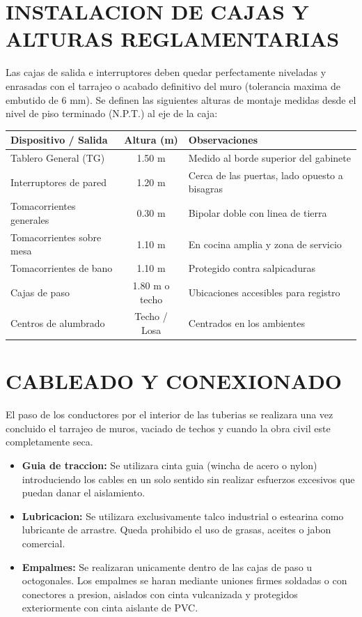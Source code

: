 \section{INSTALACION DE CAJAS Y ALTURAS REGLAMENTARIAS}

Las cajas de salida e interruptores deben quedar perfectamente niveladas y enrasadas con el tarrajeo o acabado definitivo del muro (tolerancia maxima de embutido de \(6\text{ mm}\)). Se definen las siguientes alturas de montaje medidas desde el nivel de piso terminado (N.P.T.) al eje de la caja:

\begin{center}
\begin{tabular}{l c l}
\toprule
\textbf{Dispositivo / Salida} & \textbf{Altura (m)} & \textbf{Observaciones} \\
\midrule
Tablero General (TG) & 1.50 m & Medido al borde superior del gabinete \\
Interruptores de pared & 1.20 m & Cerca de las puertas, lado opuesto a bisagras \\
Tomacorrientes generales & 0.30 m & Bipolar doble con linea de tierra \\
Tomacorrientes sobre mesa & 1.10 m & En cocina amplia y zona de servicio \\
Tomacorrientes de bano & 1.10 m & Protegido contra salpicaduras \\
Cajas de paso & 1.80 m o techo & Ubicaciones accesibles para registro \\
Centros de alumbrado & Techo / Losa & Centrados en los ambientes \\
\bottomrule
\end{tabular}
\end{center}

\section{CABLEADO Y CONEXIONADO}

El paso de los conductores por el interior de las tuberias se realizara una vez concluido el tarrajeo de muros, vaciado de techos y cuando la obra civil este completamente seca.
\begin{itemize}
  \item \textbf{Guia de traccion:} Se utilizara cinta guia (wincha de acero o nylon) introduciendo los cables en un solo sentido sin realizar esfuerzos excesivos que puedan danar el aislamiento.
  \item \textbf{Lubricacion:} Se utilizara exclusivamente talco industrial o estearina como lubricante de arrastre. Queda prohibido el uso de grasas, aceites o jabon comercial.
  \item \textbf{Empalmes:} Se realizaran unicamente dentro de las cajas de paso u octogonales. Los empalmes se haran mediante uniones firmes soldadas o con conectores a presion, aislados con cinta vulcanizada y protegidos exteriormente con cinta aislante de PVC.
\end{itemize}

